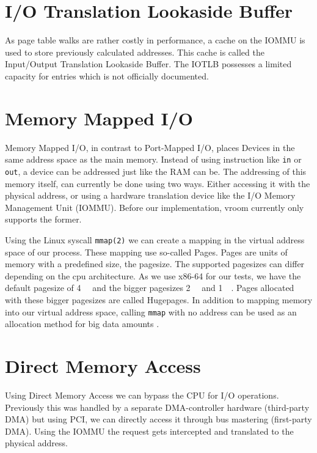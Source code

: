 \section{I/O Translation Lookaside Buffer}
As page table walks are rather costly in performance, a cache on the IOMMU is used to store previously calculated addresses. This cache is called the Input/Output Translation Lookaside Buffer. The IOTLB possesses a limited capacity for entries which is not officially documented.

\section{Memory Mapped I/O}
Memory Mapped I/O, in contrast to Port-Mapped I/O, places Devices in the same address space as the main memory. Instead of using instruction like \texttt{in} or \texttt{out}, a device can be addressed just like the RAM can be. The addressing of this memory itself, can currently be done using two ways. Either accessing it with the physical address, or using a hardware translation device like the I/O Memory Management Unit (IOMMU). Before our implementation, vroom currently only supports the former. %

Using the Linux syscall \texttt{mmap(2)} we can create a mapping in the virtual address space of our process. These mapping use so-called Pages. Pages are units of memory with a predefined size, the pagesize. The supported pagesizes can differ depending on the cpu architecture. As we use x86-64 for our tests, we have the default pagesize of \qty{4}{\kibi\byte} and the bigger pagesizes \qty{2}{\mebi\byte} and \qty{1}{\gibi\byte}. Pages allocated with these bigger pagesizes are called Hugepages. In addition to mapping memory into our virtual address space, calling \texttt{mmap} with no address can be used as an allocation method for big data amounts \cite{mmapmanpage}.

\section{Direct Memory Access}
Using Direct Memory Access we can bypass the CPU for I/O operations. Previously this was handled by a separate DMA-controller hardware (third-party DMA) but using PCI, we can directly access it through bus mastering (first-party DMA). Using the IOMMU the request gets intercepted and translated to the physical address.

